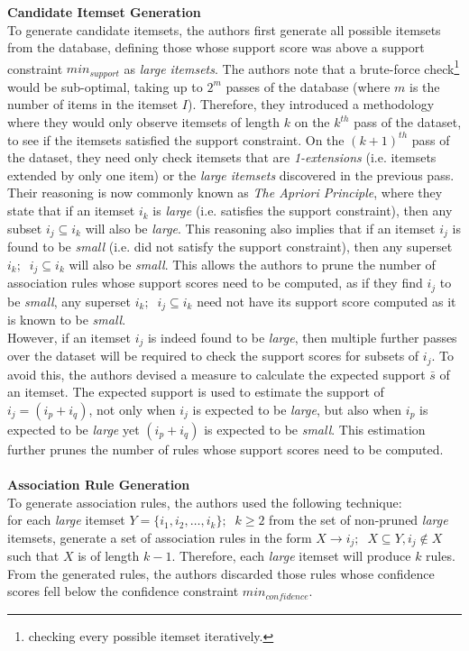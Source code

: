 \textbf{Candidate Itemset Generation}\\
To generate candidate itemsets, the authors first generate all possible itemsets from the database, defining those whose support score was above a support constraint $\textit{min}_\textit{support}$ as \textit{large itemsets}. The authors note that a brute-force check\footnote{checking every possible itemset iteratively.} would be sub-optimal, taking up to $2^m$ passes of the database (where $m$ is the number of items in the itemset $I$). Therefore, they introduced a methodology where they would only observe itemsets of length $k$ on the $k^{th}$ pass of the dataset, to see if the itemsets satisfied the support constraint. On the $(k+1)^{th}$ pass of the dataset, they need only check itemsets that are \textit{1-extensions} (i.e. itemsets extended by only one item) or the \textit{large itemsets} discovered in the previous pass. Their reasoning is now commonly known as \textit{The Apriori Principle}, where they state that if an itemset $i_k$ is \textit{large} (i.e. satisfies the support constraint), then any subset $i_j \subseteq i_k$ will also be \textit{large}. This reasoning also implies that if an itemset $i_j$ is found to be \textit{small} (i.e. did not satisfy the support constraint), then any superset $i_k;\;\; i_j \subseteq i_k$ will also be \textit{small}. This allows the authors to prune the number of association rules whose support scores need to be computed, as if they find $i_j$ to be \textit{small}, any superset $i_k;\;\; i_j \subseteq i_k$ need not have its support score computed as it is known to be \textit{small}.\\
However, if an itemset $i_j$ is indeed found to be \textit{large}, then multiple further passes over the dataset will be required to check the support scores for subsets of $i_j$. To avoid this, the authors devised a measure to calculate the expected support $\bar{s}$ of an itemset. The expected support is used to estimate the support of $i_j = (i_p + i_q)$, not only when $i_j$ is expected to be \textit{large}, but also when $i_p$ is expected to be \textit{large} yet $(i_p + i_q)$ is expected to be \textit{small}. This estimation further prunes the number of rules whose support scores need to be computed.
\\\\\textbf{Association Rule Generation}\\
To generate association rules, the authors used the following technique:\\
for each \textit{large} itemset $Y = \{i_1, i_2,\dots,i_k\};\;\; k \geq 2$ from the set of non-pruned \textit{large} itemsets, generate a set of association rules in the form $X \rightarrow i_j;\;\; X \subseteq Y, i_j \notin X$ such that $X$ is of length $k-1$. Therefore, each \textit{large} itemset will produce $k$ rules. From the generated rules, the authors discarded those rules whose confidence scores fell below the confidence constraint $\textit{min}_\textit{confidence}$.
